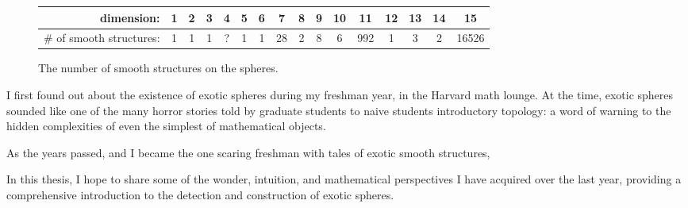 \begin{figure}[ht]
	\renewcommand{\arraystretch}{1.2}
	\centering
	\begin{tabular}{r|c|c|c|c|c|c|c|c|c|c|c|c|c|c|c}
		\textrm{dimension:}               & 1 & 2 & 3 & 4 & 5 & 6 & 7  & 8 & 9 & 10 & 11  & 12 & 13 & 14 & 15    \\
		\hline
		\textrm{\# of smooth structures:} & 1 & 1 & 1 & ? & 1 & 1 & 28 & 2 & 8 & 6  & 992 & 1  & 3  & 2  & 16526 \\
	\end{tabular}
	\caption{The number of smooth structures on the spheres.}
\end{figure}

I first found out about the existence of exotic spheres during my freshman year, in the Harvard math lounge. At the time, exotic spheres sounded like one of the many horror stories told by graduate students to naive students introductory topology: a word of warning to the hidden complexities of even the simplest of mathematical objects. 

As the years passed, and I became the one scaring freshman with tales of exotic smooth structures,

In this thesis, I hope to share some of the wonder, intuition, and mathematical perspectives I have acquired over the last year, providing a comprehensive introduction to the detection and construction of exotic spheres.




%
%
